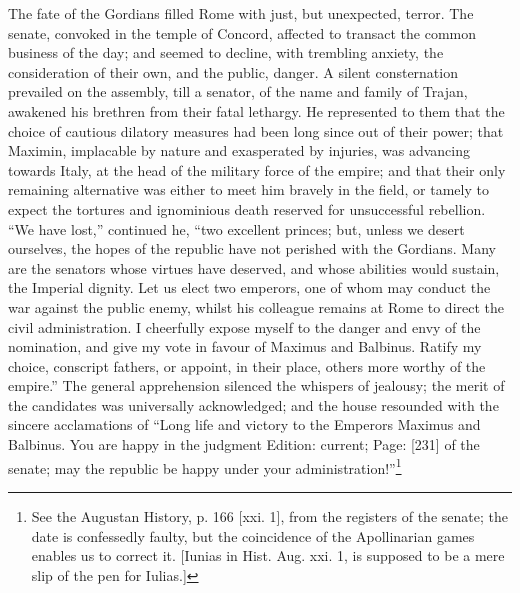 The fate of the Gordians filled Rome with just, but unexpected, terror. The senate, convoked in the temple of Concord, affected to transact the common business of the day; and seemed to decline, with trembling anxiety, the consideration of their own, and the public, danger. A silent consternation prevailed on the assembly, till a senator, of the name and family of Trajan, awakened his brethren from their fatal lethargy. He represented to them that the choice of cautious dilatory measures had been long since out of their power; that Maximin, implacable by nature and exasperated by injuries, was advancing towards Italy, at the head of the military force of the empire; and that their only remaining alternative was either to meet him bravely in the field, or tamely to expect the tortures and ignominious death reserved for unsuccessful rebellion. \texthebrew{“}We have lost,\texthebrew{}” continued he, \texthebrew{“}two excellent princes; but, unless we desert ourselves, the hopes of the republic have not perished with the Gordians. Many are the senators whose virtues have deserved, and whose abilities would sustain, the Imperial dignity. Let us elect two emperors, one of whom may conduct the war against the public enemy, whilst his colleague remains at Rome to direct the civil administration. I cheerfully expose myself to the danger and envy of the nomination, and give my vote in favour of Maximus and Balbinus. Ratify my choice, conscript fathers, or appoint, in their place, others more worthy of the empire.\texthebrew{}” The general apprehension silenced the whispers of jealousy; the merit of the candidates was universally acknowledged; and the house resounded with the sincere acclamations of \texthebrew{“}Long life and victory to the Emperors Maximus and Balbinus. You are happy in the judgment Edition: current; Page: [231] of the senate; may the republic be happy under your administration!\texthebrew{}”\footnote{See the Augustan History, p. 166 [xxi. 1], from the registers of the senate; the date is confessedly faulty, but the coincidence of the Apollinarian games enables us to correct it. [Iunias in Hist. Aug. xxi. 1, is supposed to be a mere slip of the pen for Iulias.]}

